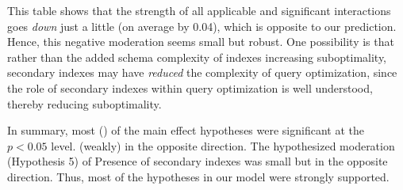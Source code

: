 \documentclass[prodmode,acmtods]{acmsmall}
\begin{document}
\begin{table}[t]
\tbl{Testing Hypothesis 5: Interaction Strength on the Confirmatory Study\label{tab:hyptest5}}{%
\begin{tabular}{c|c|c|c|c\discont{|c|c}{}}
{\em Variable}& \multicolumn{2}{|c|}{{\em Repeats}}&\multicolumn{2}{|c}{{\em CEPS}} \discont{& \multicolumn{2}{|c}{{\em Discontinuity}}}{}\\
{\em }&{Not SI\em }&{SI\em }&{Not SI\em }&{SI\em }\discont{&{Not SI\em }&{SI\em }}{}\\
\hline
\hline
Correlation names & 0.17 & 0.15 &0.49 &0.39 \discont{& 0.36 & 0.27}{} \\
\hline
Presence of aggregate  & 0.04 & {\em NS} & 0.12 & {\em NS} \discont{& 0.31 & 0.22}{} \\
\hline
Presence of subquery  & 0.03 & {\em NS} & 0.18 & 0.17  \discont{& 0.14 & 0.13}{}\\
\end{tabular}
}
\end{table}

This table shows that the strength of all  applicable and significant
interactions goes {\em down} just a little (on average by 0.04), which is
opposite to our prediction. Hence, this negative moderation seems small but
robust. One possibility is that rather than the added schema complexity of
indexes increasing suboptimality, secondary indexes may have {\em reduced} the complexity of query
optimization, since the role of secondary indexes within query optimization
is well understood, thereby reducing suboptimality.

In summary, most () of the main effect hypotheses were
significant at the $p < 0.05$ level.  (weakly)
in the opposite direction. The hypothesized moderation (Hypothesis 5) of
Presence of secondary indexes was small but in the opposite direction. Thus,
most of the hypotheses in our model were strongly supported.
\end{document}

